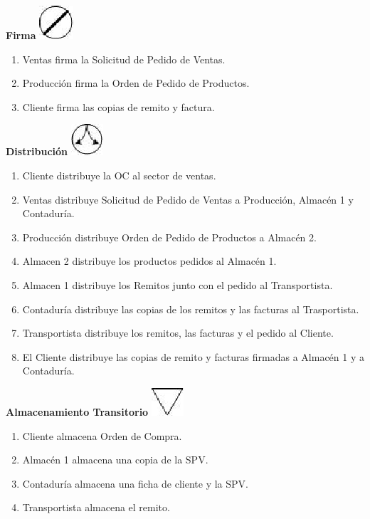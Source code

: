 \begin{center}
  \textbf{Firma}
  \includegraphics{./Images/Simbolos/simbolo-Firma.png}
\end{center}
\begin{enumerate}
  \item Ventas firma la Solicitud de Pedido de Ventas.
  \item Producci\'on firma la Orden de Pedido de Productos.
  \item Cliente firma las copias de remito y factura.
\end{enumerate}

\begin{center}
  \textbf{Distribuci\'on}
  \includegraphics{./Images/Simbolos/simbolo-Distribucion.png}
\end{center}
\begin{enumerate}
  \item Cliente distribuye la OC al sector de ventas.
  \item Ventas distribuye Solicitud de Pedido de Ventas a Producci\'on, Almac\'en 1 y Contadur\'ia.
  \item Producci\'on distribuye Orden de Pedido de Productos a Almac\'en 2.
  \item Almacen 2 distribuye los productos pedidos al Almac\'en 1.
  \item Almacen 1 distribuye los Remitos junto con el pedido al Transportista.
  \item Contadur\'ia distribuye las copias de los remitos y las facturas al Trasportista.
  \item Transportista distribuye los remitos, las facturas y el pedido al Cliente.
  \item El Cliente distribuye las copias de remito y facturas firmadas a Almac\'en 1 y a Contadur\'ia.
\end{enumerate}

\begin{center}
  \textbf{Almacenamiento Transitorio}
  \includegraphics{./Images/Simbolos/simbolo-Almacenamiento-Transitorio.png}
\end{center}
\begin{enumerate}
  \item Cliente almacena Orden de Compra.
  \item Almac\'en 1 almacena una copia de la SPV.
  \item Contadur\'ia almacena una ficha de cliente y la SPV.
  \item Transportista almacena el remito.
\end{enumerate}

